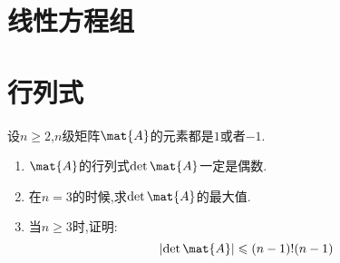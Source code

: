 \documentclass{ctexart}
\begin{document}
\section{线性方程组}
\section{行列式}
\begin{problem}
    设$n\geqslant 2$,$n$级矩阵$\mat{A}$的元素都是$1$或者$-1$.
    \begin{enumerate}[label=\tbf{\arabic*}.,topsep=0pt,parsep=0pt,itemsep=0pt,partopsep=0pt]
        \item $\mat{A}$的行列式$\det\mat{A}$一定是偶数.
        \item 在$n=3$的时候,求$\det\mat{A}$的最大值.
        \item 当$n\geqslant 3$时,证明:
            \[\left|\det\mat{A}\right|\leqslant(n-1)!(n-1)\]
    \end{enumerate}
\end{problem}
\end{document}
